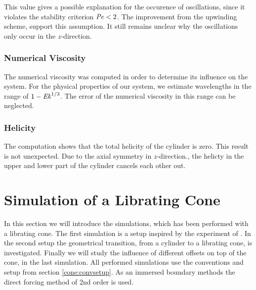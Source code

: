 This value gives a possible explanation for the occurence of oscillations,
since it violates the stability criterion $\mbox{\textit{Pe}}<2$.
The improvement from the upwinding scheme, support this assumption.
It still remains unclear why the oscillations only occur in the $z$-direction.

\subsubsection{Numerical Viscosity}

The numerical viscosity was computed in order to determine its influence on the system.
For the physical properties of our system, we estimate wavelengths in the range of $1 - \mbox{\textit{Ek}}^{1/3}$.
The error of the numerical viscosity in this range can be neglected.

\subsubsection{Helicity}

The computation shows that the total helicity of the cylinder is zero.
This result is not unexpected.
Due to the axial symmetry in $z$-direction., the helicty in the upper and lower part of the cylinder cancels each other out.

\newpage

\section{Simulation of a Librating Cone}

In this section we will introduce the simulations, which has been performed
with a librating cone. The first simulation is a setup inspired by the experiment of \citep{Beardsley1970}.
In the second setup the geometrical transition, from a cylinder to a librating cone, is investigated.
Finally we will study the influence of different offsets on top of the cone, in the last simulation.
All performed simulations use the conventions and setup from section \ref{cone:convsetup}.
As an immersed boundary methods the direct forcing  method of 2nd order is used.

